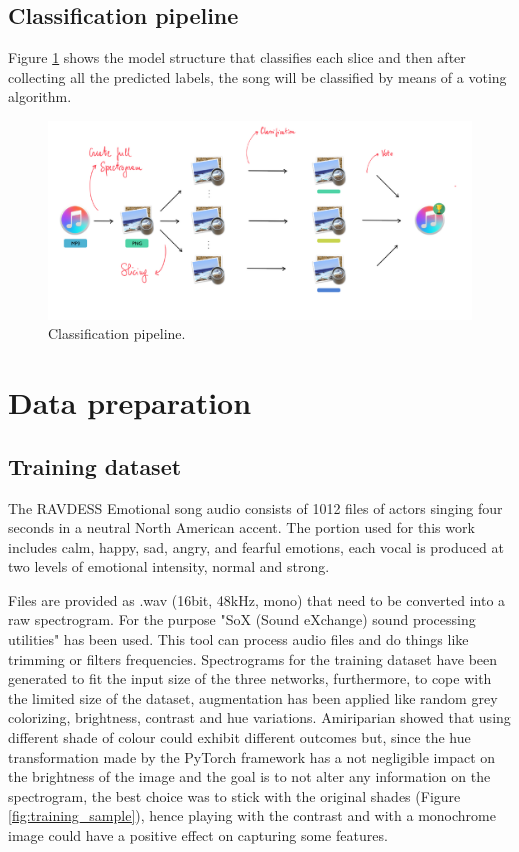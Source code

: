 \documentclass[10pt,twocolumn,letterpaper]{article}
\begin{document}
\subsection{Classification pipeline}

Figure \ref{fig:pipeline} shows the model structure that classifies each slice and then after collecting all the predicted labels, the song will be classified by means of a voting algorithm.

\begin{figure}
   \begin{center}
   \includegraphics[width=0.8\linewidth]{img/Pipeline-project}
   \end{center}
      \caption{Classification pipeline.}
   \label{fig:pipeline}
   \end{figure}

\section{Data preparation}

\subsection{Training dataset}

The RAVDESS Emotional song audio consists of 1012 files of actors singing four seconds in a neutral North American accent. The portion used for this work includes calm, happy, sad, angry, and fearful emotions, each vocal is produced at two levels of emotional intensity, normal and strong.

Files are provided as .wav (16bit, 48kHz, mono) that need to be converted into a raw spectrogram. For the purpose "SoX (Sound eXchange) sound processing utilities" has been used. This tool can process audio files and do things like trimming or filters frequencies. Spectrograms for the training dataset have been generated to fit the input size of the three networks, furthermore, to cope with the limited size of the dataset, augmentation has been applied like random grey colorizing, brightness, contrast and hue variations. Amiriparian \etal \cite{Amiriparian} showed that using different shade of colour could exhibit different outcomes but, since the hue transformation made by the PyTorch framework has a not negligible impact on the brightness of the image and the goal is to not alter any information on the spectrogram, the best choice was to stick with the original shades (Figure \ref{fig:training_sample}), hence playing with the contrast and with a monochrome image could have a positive effect on capturing some features.
\end{document}
